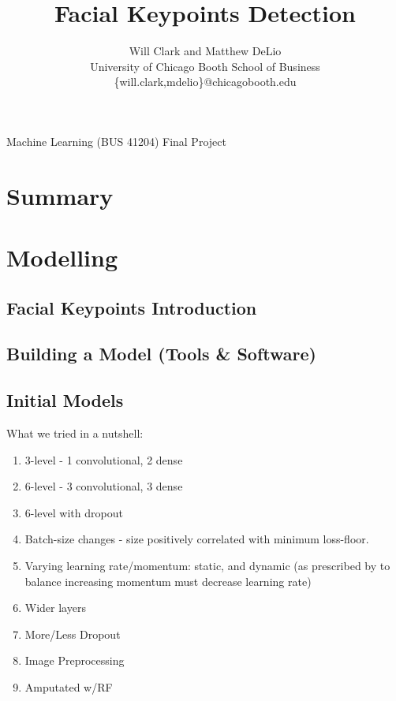 \documentclass[journal]{IEEEtran}
\begin{document}
\title{Facial Keypoints Detection}
\author{Will Clark and Matthew DeLio\\
University of Chicago Booth School of Business\\
\textsf{\{will.clark,mdelio\}@chicagobooth.edu}}

{Machine Learning (BUS 41204) Final Project}

\maketitle

\section{Summary}

\section{Modelling}
\subsection{Facial Keypoints Introduction}
\subsection{Building a Model (Tools \& Software)}


\subsection{Initial Models}
What we tried in a nutshell:
\begin{enumerate}
\item 3-level - 1 convolutional, 2 dense
\item 6-level - 3 convolutional, 3 dense
\item 6-level with dropout
\item Batch-size changes - size positively correlated with minimum loss-floor.
\item Varying learning rate/momentum: static, and dynamic (as prescribed by \cite{lasagnenesterov} to balance increasing momentum must decrease learning rate)
\item Wider layers
\item More/Less Dropout
\item Image Preprocessing
\item Amputated w/RF
\end{enumerate}
\end{document}
